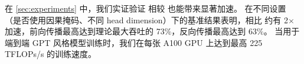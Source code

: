 在 \cref{sec:experiments} 中，我们实证验证 \sysname 相较 \sysnameone 也能带来显著加速。
在不同设置（是否使用因果掩码、不同 head dimension）下的基准结果表明，\sysname 相比 \sysnameone 约有 2$\times$ 加速，前向传播最高达到理论最大吞吐的 73\%，反向传播最高达到 63\%。
当用于端到端 GPT 风格模型训练时，我们在每张 A100 GPU 上达到最高 225 TFLOPs/s 的训练速度。


